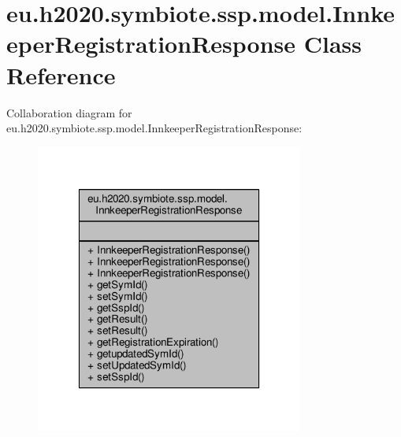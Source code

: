 \hypertarget{classeu_1_1h2020_1_1symbiote_1_1ssp_1_1model_1_1InnkeeperRegistrationResponse}{}\section{eu.\+h2020.\+symbiote.\+ssp.\+model.\+Innkeeper\+Registration\+Response Class Reference}
\label{classeu_1_1h2020_1_1symbiote_1_1ssp_1_1model_1_1InnkeeperRegistrationResponse}


Collaboration diagram for eu.\+h2020.\+symbiote.\+ssp.\+model.\+Innkeeper\+Registration\+Response\+:\nopagebreak
\begin{figure}[H]
\begin{center}
\leavevmode
\includegraphics[width=250pt]{classeu_1_1h2020_1_1symbiote_1_1ssp_1_1model_1_1InnkeeperRegistrationResponse__coll__graph}
\end{center}
\end{figure}
